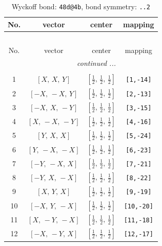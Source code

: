 \documentclass[fleqn,8pt]{jsarticle}
\begin{document}
\begin{longtable}{cccc}
\caption{Wyckoff bond: {\tt 48d@4b}, bond symmetry: {\tt ..2}}
 \\
 \hline \hline
No. & vector & center & mapping \\ \hline \endfirsthead

\multicolumn{3}{l}{\tablename\ \thetable{}} \\
 \hline \hline
No. & vector & center & mapping \\ \hline \endhead

 \hline \hline
\multicolumn{3}{r}{\footnotesize\it continued ...} \\ \endfoot

 \hline \hline
\multicolumn{3}{r}{} \\ \endlastfoot

1 & $\left[ X,\, X,\, Y \right]$ & $\left[ \frac{1}{2},\, \frac{1}{2},\, \frac{1}{2} \right]$ & {\tt [1,-14]} \\ \hline
2 & $\left[ - X,\, - X,\, Y \right]$ & $\left[ \frac{1}{2},\, \frac{1}{2},\, \frac{1}{2} \right]$ & {\tt [2,-13]} \\ \hline
3 & $\left[ - X,\, X,\, - Y \right]$ & $\left[ \frac{1}{2},\, \frac{1}{2},\, \frac{1}{2} \right]$ & {\tt [3,-15]} \\ \hline
4 & $\left[ X,\, - X,\, - Y \right]$ & $\left[ \frac{1}{2},\, \frac{1}{2},\, \frac{1}{2} \right]$ & {\tt [4,-16]} \\ \hline
5 & $\left[ Y,\, X,\, X \right]$ & $\left[ \frac{1}{2},\, \frac{1}{2},\, \frac{1}{2} \right]$ & {\tt [5,-24]} \\ \hline
6 & $\left[ Y,\, - X,\, - X \right]$ & $\left[ \frac{1}{2},\, \frac{1}{2},\, \frac{1}{2} \right]$ & {\tt [6,-23]} \\ \hline
7 & $\left[ - Y,\, - X,\, X \right]$ & $\left[ \frac{1}{2},\, \frac{1}{2},\, \frac{1}{2} \right]$ & {\tt [7,-21]} \\ \hline
8 & $\left[ - Y,\, X,\, - X \right]$ & $\left[ \frac{1}{2},\, \frac{1}{2},\, \frac{1}{2} \right]$ & {\tt [8,-22]} \\ \hline
9 & $\left[ X,\, Y,\, X \right]$ & $\left[ \frac{1}{2},\, \frac{1}{2},\, \frac{1}{2} \right]$ & {\tt [9,-19]} \\ \hline
10 & $\left[ - X,\, Y,\, - X \right]$ & $\left[ \frac{1}{2},\, \frac{1}{2},\, \frac{1}{2} \right]$ & {\tt [10,-20]} \\ \hline
11 & $\left[ X,\, - Y,\, - X \right]$ & $\left[ \frac{1}{2},\, \frac{1}{2},\, \frac{1}{2} \right]$ & {\tt [11,-18]} \\ \hline
12 & $\left[ - X,\, - Y,\, X \right]$ & $\left[ \frac{1}{2},\, \frac{1}{2},\, \frac{1}{2} \right]$ & {\tt [12,-17]} \\
\end{longtable}
\end{document}
